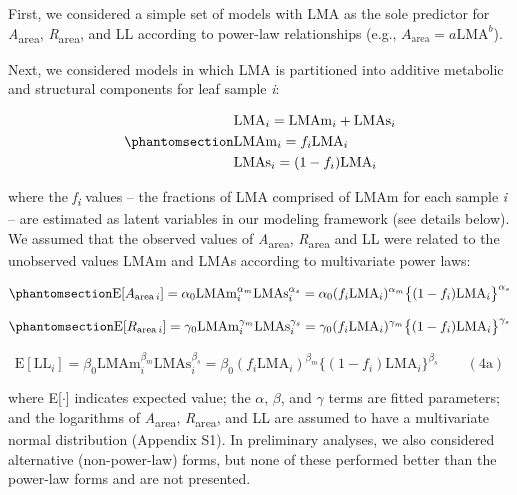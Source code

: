 \documentclass[
  12pt,
  letterpaper,
  DIV=11,
  numbers=noendperiod]{scrartcl}
\begin{document}
First, we considered a simple set of models with LMA as the sole
predictor for \emph{A}\textsubscript{area},
\emph{R}\textsubscript{area}, and LL according to power-law
relationships (e.g., \(A_{\mathrm{area}} = a\mathrm{LMA}^b\)).

Next, we considered models in which LMA is partitioned into additive
metabolic and structural components for leaf sample \emph{i}:

\begin{equation}\phantomsection\label{eq-LMA}{
\begin{aligned}
  &\mathrm{LMA}_{i} =\mathrm{LMAm}_{i} + \mathrm{LMAs}_{i} \\
  &\mathrm{LMAm}_{i} = f_{i} \mathrm{LMA}_{i} \\
  &\mathrm{LMAs}_{i} = (1 - f_{i})  \mathrm{LMA}_{i}
\end{aligned}
}\end{equation}

where the \emph{f\textsubscript{i}} values -- the fractions of LMA
comprised of LMAm for each sample \emph{i} -- are estimated as latent
variables in our modeling framework (see details below). We assumed that
the observed values of \emph{A}\textsubscript{area},
\emph{R}\textsubscript{area} and LL were related to the unobserved
values LMAm and LMAs according to multivariate power laws:

\begin{equation}\phantomsection\label{eq-Aarea}{
\mathrm{E}[A_{\mathrm{area} \, i}]
= \alpha_0\mathrm{LMAm}_{i}^{\alpha_m}\mathrm{LMAs}_i^{\alpha_s}  =  \alpha_0 (f_i \mathrm{LMA}_{i})^{\alpha_m} \bigl\{(1-f_i) \mathrm{LMA}_{i}\bigr\}^{\alpha_s}
}\end{equation}

\begin{equation}\phantomsection\label{eq-Rarea}{
\mathrm{E}[R_{\mathrm{area} \, i}]
= \gamma_0\mathrm{LMAm}_{i}^{\gamma_m} \mathrm{LMAs}_{i}^{\gamma_s}
= \gamma_0 (f_i \mathrm{LMA}_{i})^{\gamma_m} \bigl\{(1-f_i)\mathrm{LMA}_{i}\bigr\}^{\gamma_s}
}\end{equation}

\[
\mathrm{E}[\mathrm{LL}_i] = \beta_0\mathrm{LMAm}_{i}^{\beta_m} \mathrm{LMAs}_{i}^{\beta_s}  = \beta_0 (f_i \mathrm{LMA}_{i})^{\beta_m} \bigl\{(1-f_i) \mathrm{LMA}_{i}\bigr\}^{\beta_s} \qquad(4\mathrm{a})
\]

where E{[}\(\cdot\){]} indicates expected value; the \(\alpha\),
\(\beta\), and \(\gamma\) terms are fitted parameters; and the
logarithms of \emph{A}\textsubscript{area},
\emph{R}\textsubscript{area}, and LL are assumed to have a multivariate
normal distribution (Appendix S1). In preliminary analyses, we also
considered alternative (non-power-law) forms, but none of these
performed better than the power-law forms and are not presented.
\end{document}
